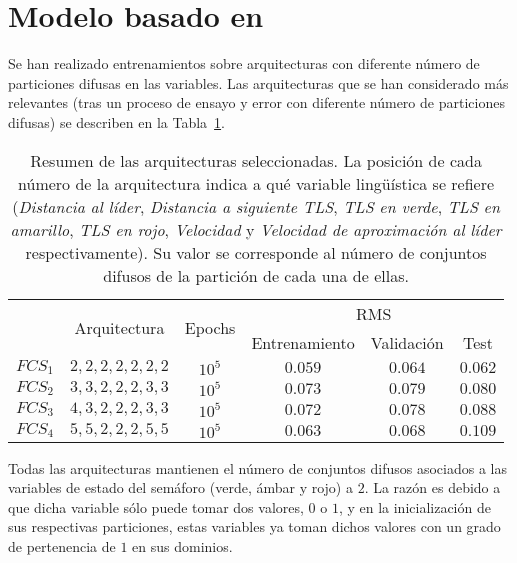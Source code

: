 \section{Modelo basado en }

Se han realizado entrenamientos sobre arquitecturas con diferente número de particiones difusas en las variables. Las arquitecturas que se han considerado más relevantes (tras un proceso de ensayo y error con diferente número de particiones difusas) se describen en la Tabla~\ref{tbl:cf-fcs-architectures}. 

\begin{table}[t]
	\centering
	\small
	\caption[Resumen de las arquitecturas \ac{fcs} para el modelo longitudinal]{Resumen de las arquitecturas seleccionadas. La posición de cada número de la arquitectura indica a qué variable lingüística se refiere (\textit{Distancia al líder}, \textit{Distancia a siguiente TLS}, \textit{TLS en verde}, \textit{TLS en amarillo}, \textit{TLS en rojo}, \textit{Velocidad} y \textit{Velocidad de aproximación al líder} respectivamente). Su valor se corresponde al número de conjuntos difusos de la partición de cada una de ellas.}
	\label{tbl:cf-fcs-architectures}
	\begin{tabular}{cccccc}
		\toprule
		\multirow{2}{*}{} & \multirow{2}{*}{Arquitectura} & \multirow{2}{*}{Epochs} & \multicolumn{3}{c}{RMS}      \\ 
		& & & Entrenamiento & Validación & Test \\
		\midrule
		\rowcolor{black!20} $FCS_1$ & $2, 2, 2, 2, 2, 2, 2$ & $10^5$ & $0.059$ & $0.064$ & $0.062$  \\
		$FCS_2$ & $3, 3, 2, 2, 2, 3, 3$ & $10^5$ & $0.073$ & $0.079$ & $0.080$  \\
		\rowcolor{black!20} $FCS_3$ & $4, 3, 2, 2, 2, 3, 3$ & $10^5$ & $0.072$ & $0.078$ & $0.088$  \\
		$FCS_4$ & $5, 5, 2, 2, 2, 5, 5$ & $10^5$ & $0.063$ & $0.068$ & $0.109$  \\
		\bottomrule
	\end{tabular}
\end{table}

Todas las arquitecturas mantienen el número de conjuntos difusos asociados a las variables de estado del semáforo (verde, ámbar y rojo) a $2$. La razón es debido a que dicha variable sólo puede tomar dos valores, $0$ o $1$, y en la inicialización de sus respectivas particiones, estas variables ya toman dichos valores con un grado de pertenencia de $1$ en sus dominios.

